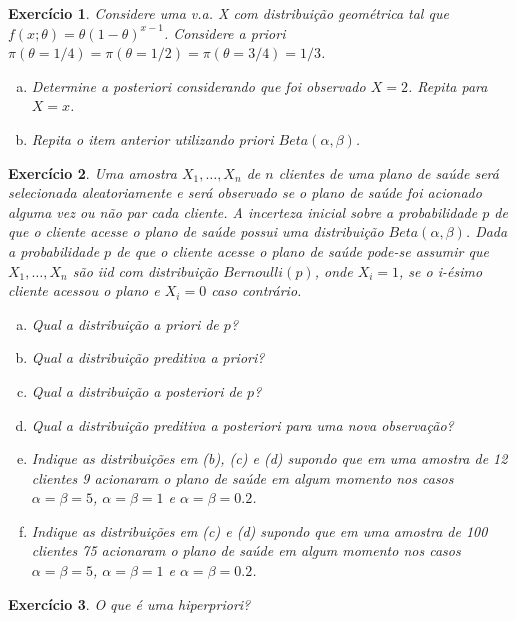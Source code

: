 \documentclass[letter,11pt]{article}
\newtheorem{exer}{Exercício}
\begin{document}
\bigskip
\begin{exer} \rm
Considere uma v.a. X com distribuição geométrica tal que $f(x; \theta) = \theta (1-\theta)^{x-1}$. Considere a \textit{priori} $\pi(\theta=1/4)=\pi(\theta=1/2)=\pi(\theta=3/4)=1/3$.
\begin{enumerate}[a)]	
	\item Determine \textit{a posteriori} considerando que foi observado $X=2$. Repita para $X=x$.
	\item Repita o item anterior utilizando \textit{priori} $Beta(\alpha,\beta)$.
\end{enumerate}
\end{exer}


\bigskip
\begin{exer} \rm
Uma amostra $X_1, \ldots, X_n$ de $n$ clientes de uma plano de saúde será selecionada aleatoriamente e será observado se o plano de saúde foi acionado alguma vez ou não par cada cliente. A incerteza inicial sobre a probabilidade $p$ de que o cliente acesse o plano de saúde possui uma distribuição $Beta(\alpha, \beta)$. Dada a probabilidade $p$ de que o cliente acesse o plano de saúde pode-se assumir que $X_1, \ldots, X_n$ são iid com distribuição $Bernoulli(p)$, onde $X_i=1$, se o i-ésimo cliente acessou o plano e $X_i=0$ caso contrário.
\begin{enumerate}[a)]
  \item Qual a distribuição a \textit{priori} de $p$?
  \item Qual a distribuição preditiva a \textit{priori}?
  \item Qual a distribuição a \textit{posteriori} de $p$?
  \item Qual a distribuição preditiva a \textit{posteriori} para uma nova observação?
  \item Indique as distribuições em (b), (c) e (d) supondo que em uma amostra de 12 clientes 9 acionaram o plano de saúde em algum momento nos casos $\alpha=\beta=5$, $\alpha=\beta=1$ e $\alpha=\beta=0.2$.
  \item Indique as distribuições em (c) e (d) supondo que em uma amostra de 100 clientes 75 acionaram o plano de saúde em algum momento nos casos $\alpha=\beta=5$, $\alpha=\beta=1$ e $\alpha=\beta=0.2$.
\end{enumerate}
\end{exer}


\bigskip
\begin{exer} \rm
O que é uma hiperpriori?
\end{exer}
\end{document}
